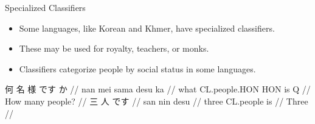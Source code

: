 \documentclass{beamer}
\begin{document}
\begin{frame}{Specialized Classifiers}
\begin{itemize}
    \item Some languages, like Korean and Khmer, have specialized classifiers.
    \item These may be used for royalty, teachers, or monks.
    \item Classifiers categorize people by social status in some languages.
    \end{itemize}
\ex
\begingl
\gla 何 名 様 です か //
\glb nan mei sama desu ka //
\glc what CL.people.HON HON is Q //
\glft How many people? //
\endgl
\xe
\ex
\begingl
\gla 三 人 です //
\glb san nin desu //
\glc three CL.people is //
\glft Three //
\endgl
\xe
    
\end{frame}
\end{document}
